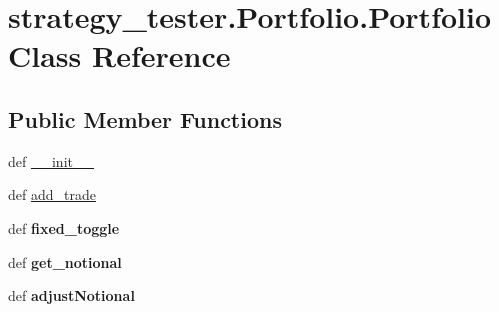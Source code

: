 \hypertarget{classstrategy__tester_1_1Portfolio_1_1Portfolio}{\section{strategy\-\_\-tester.\-Portfolio.\-Portfolio \-Class \-Reference}
\label{classstrategy__tester_1_1Portfolio_1_1Portfolio}
}
\subsection*{\-Public \-Member \-Functions}
\begin{DoxyCompactItemize}
\item 
def \hyperlink{classstrategy__tester_1_1Portfolio_1_1Portfolio_a19de536f09518fdf0e6f5fadbf4eddfd}{\-\_\-\-\_\-init\-\_\-\-\_\-}
\item 
def \hyperlink{classstrategy__tester_1_1Portfolio_1_1Portfolio_ada59d493b15b79f67fdf309e08427c8d}{add\-\_\-trade}
\item 
\hypertarget{classstrategy__tester_1_1Portfolio_1_1Portfolio_ac8122f65e152980ee522f51ab06be64b}{def {\bfseries fixed\-\_\-toggle}}\label{classstrategy__tester_1_1Portfolio_1_1Portfolio_ac8122f65e152980ee522f51ab06be64b}

\item 
\hypertarget{classstrategy__tester_1_1Portfolio_1_1Portfolio_af0687f69c517bd3c6a6c3596eb6640ae}{def {\bfseries get\-\_\-notional}}\label{classstrategy__tester_1_1Portfolio_1_1Portfolio_af0687f69c517bd3c6a6c3596eb6640ae}

\item 
\hypertarget{classstrategy__tester_1_1Portfolio_1_1Portfolio_adb936fa7f109b6090a4f47b713b90c71}{def {\bfseries adjust\-Notional}}\label{classstrategy__tester_1_1Portfolio_1_1Portfolio_adb936fa7f109b6090a4f47b713b90c71}

\end{DoxyCompactItemize}
